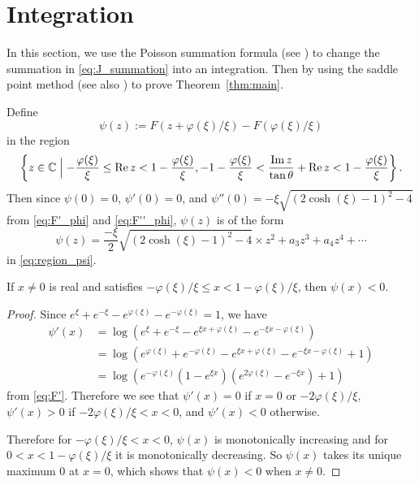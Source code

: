 \section{Integration}\label{sec:integration}
In this section, we use the Poisson summation formula (see \cite[Proposition~4.2]{Ohtsuki:QT2016}) to change the summation in \eqref{eq:J_summation} into an integration.
Then by using the saddle point method (see also \cite[Proposition~3.2]{Ohtsuki:QT2016}) to prove Theorem~\ref{thm:main}.
\par
Define
\begin{equation*}
  \psi(z)
  :=
  F(z+\varphi(\xi)/\xi)-F(\varphi(\xi)/\xi)
\end{equation*}
in the region
\begin{equation}\label{eq:region_psi}
  \left\{
    z\in\mathbb{C}
    \Bigm|
    -\frac{\varphi(\xi)}{\xi}\le\operatorname{Re}{z}<1-\frac{\varphi(\xi)}{\xi},
    -1-\frac{\varphi(\xi)}{\xi}<\frac{\operatorname{Im}{z}}{\tan\theta}+\operatorname{Re}{z}<1-\frac{\varphi(\xi)}{\xi}
  \right\}.
\end{equation}
Then since $\psi(0)=0$, $\psi'(0)=0$, and $\psi''(0)=-\xi\sqrt{(2\cosh(\xi)-1)^2-4}$ from \eqref{eq:F'_phi} and \eqref{eq:F''_phi}, $\psi(z)$ is of the form
\begin{equation*}
  \psi(z)
  =
  \frac{-\xi}{2}\sqrt{(2\cosh(\xi)-1)^2-4}\times z^2+a_3z^3+a_4z^4+\cdots
\end{equation*}
in \eqref{eq:region_psi}.
\begin{lem}\label{lem:psi_negative}
If $x\ne0$ is real and satisfies $-\varphi(\xi)/\xi\le x<1-\varphi(\xi)/\xi$, then $\psi(x)<0$.
\end{lem}
\begin{proof}
Since $e^{\xi}+e^{-\xi}-e^{\varphi(\xi)}-e^{-\varphi(\xi)}=1$, we have
\begin{equation}\label{eq:psi'}
\begin{split}
  \psi'(x)
  &=
  \log(e^{\xi}+e^{-\xi}-e^{\xi x+\varphi(\xi)}-e^{-\xi x-\varphi(\xi)})
  \\
  &=
  \log(e^{\varphi(\xi)}+e^{-\varphi(\xi)}-e^{\xi x+\varphi(\xi)}-e^{-\xi x-\varphi(\xi)}+1)
  \\
  &=
  \log
  \left(
    e^{-\varphi(\xi)}(1-e^{\xi x})(e^{2\varphi(\xi)}-e^{-\xi x})+1
  \right)
\end{split}
\end{equation}
from \eqref{eq:F'}.
Therefore we see that $\psi'(x)=0$ if $x=0$ or $-2\varphi(\xi)/\xi$, $\psi'(x)>0$ if $-2\varphi(\xi)/\xi<x<0$, and $\psi'(x)<0$ otherwise.
\par
Therefore for $-\varphi(\xi)/\xi<x<0$, $\psi(x)$ is monotonically increasing and for $0<x<1-\varphi(\xi)/\xi$ it is monotonically decreasing.
So $\psi(x)$ takes its unique maximum $0$ at $x=0$, which shows that $\psi(x)<0$ when $x\ne0$.

\end{proof}
